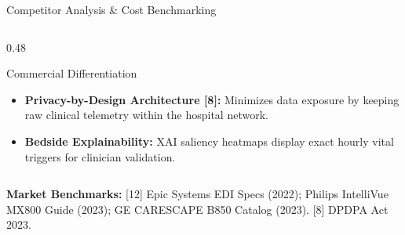 \documentclass[aspectratio=169, 11pt]{beamer}
\begin{document}
\begin{frame}{Competitor Analysis \& Cost Benchmarking}
\begin{columns}[t]
        \begin{column}{0.48\textwidth}
            \begin{block}{\textcolor{neonTeal}{Commercial Differentiation}}
                \tiny
                \begin{itemize}
                    \item \textbf{Privacy-by-Design Architecture [8]:} Minimizes data exposure by keeping raw clinical telemetry within the hospital network.
                    \item \textbf{Bedside Explainability:} XAI saliency heatmaps display exact hourly vital triggers for clinician validation.
                \end{itemize}
            \end{block}
        \end{column}
    \end{columns}

    \vspace{0.02cm}
    \begin{block}{}
        \tiny \textcolor{neonCyan}{\textbf{Market Benchmarks:}} \textcolor{mutedText}{[12] Epic Systems EDI Specs (2022); Philips IntelliVue MX800 Guide (2023); GE CARESCAPE B850 Catalog (2023). [8] DPDPA Act 2023.}
    \end{block}
\end{frame}
\end{document}
